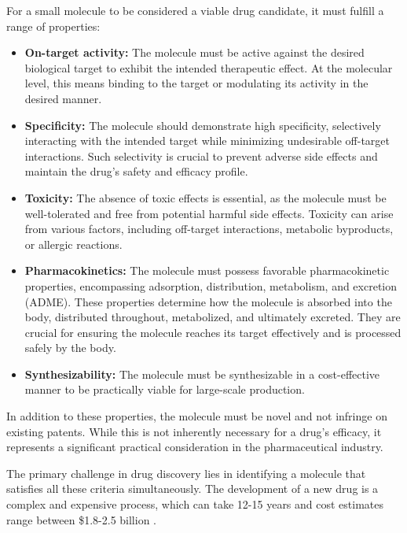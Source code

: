 For a small molecule to be considered a viable drug candidate, it must fulfill a range of properties:
\begin{itemize}
      \item \textbf{On-target activity:} The molecule must be active against the desired biological target to exhibit
            the intended therapeutic effect. At the molecular level, this means binding to the target or
            modulating its activity in the desired manner.
      \item \textbf{Specificity:} The molecule should demonstrate high specificity, selectively
            interacting with the intended target while minimizing undesirable off-target interactions. Such
            selectivity is crucial to prevent adverse side effects and maintain the drug's safety and efficacy
            profile.
      \item \textbf{Toxicity:} The absence of toxic effects is essential, as the molecule must be
            well-tolerated and free from potential harmful side effects. Toxicity can arise from various
            factors, including off-target interactions, metabolic byproducts, or allergic reactions.
      \item \textbf{Pharmacokinetics:} The molecule must possess favorable pharmacokinetic properties,
            encompassing adsorption, distribution, metabolism, and excretion (ADME). These properties determine
            how the molecule is absorbed into the body, distributed throughout, metabolized, and ultimately
            excreted. They are crucial for ensuring the molecule reaches its target effectively and is processed
            safely by the body.
      \item \textbf{Synthesizability:} The molecule must be synthesizable in a cost-effective manner to be
            practically viable for large-scale production.
\end{itemize}

In addition to these properties, the molecule must be novel and not infringe on existing patents.
While this is not inherently necessary for a drug's efficacy, it represents a significant practical
consideration in the pharmaceutical industry.

The primary challenge in drug discovery lies in identifying a molecule that satisfies all these
criteria simultaneously. The development of a new drug is a complex and expensive process, which can
take 12-15 years and cost estimates range between \$1.8-2.5 billion \citep{hughesPrinciplesEarlyDrug2011,paulHowImproveProductivity2010,dimasiInnovationPharmaceuticalIndustry2016}.

